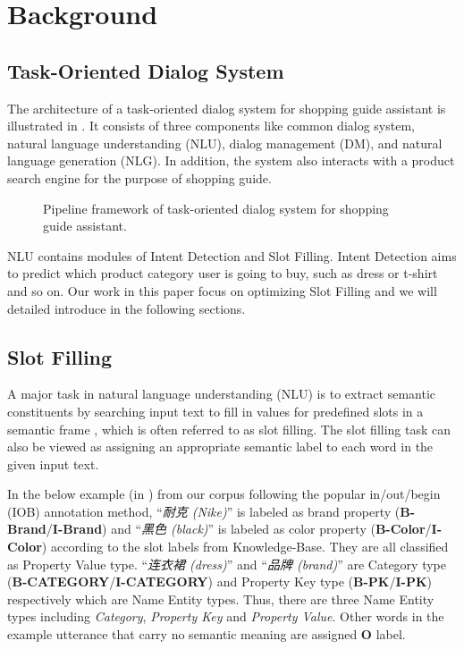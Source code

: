 \section{Background}
\label{sec:background}

\subsection{Task-Oriented Dialog System}
The architecture of a task-oriented dialog system
for shopping guide assistant is illustrated in .
It consists of three components like common dialog system, natural
language understanding (NLU), dialog management
(DM), and natural language generation (NLG).
In addition, the system also interacts with a product search engine
for the purpose of shopping guide. 
\begin{figure}[h]
	\centering
	\caption{Pipeline framework of task-oriented dialog system for shopping guide assistant.}
	\label{fig:dialog_system}
	\vspace{-10pt}
\end{figure}

NLU contains modules of Intent Detection and Slot Filling.
Intent Detection aims to predict which product category user is going to buy,
such as dress or t-shirt and so on.
Our work in this paper focus on optimizing Slot Filling
and we will detailed introduce in the following sections.

\subsection{Slot Filling}
\label{sec:slot_filling}
A major task in natural language understanding (NLU) is to extract semantic constituents
by searching input text to fill in values for predefined slots in a semantic frame \cite{mesnil2015using},
which is often referred to as slot filling.
The slot filling task can also be viewed as assigning
an appropriate semantic label to each word in
the given input text.

In the below example (in ) from our corpus following the popular in/out/begin (IOB) annotation method,
``\emph{耐克 (Nike)}'' is labeled as brand property (\textbf{B-Brand}/\textbf{I-Brand}) and ``\emph{黑色 (black)}'' is labeled as color property (\textbf{B-Color}/\textbf{I-Color})
according to the slot labels from Knowledge-Base.
They are all classified as Property Value type.
``\emph{连衣裙 (dress)}'' and ``\emph{品牌 (brand)}'' are Category type (\textbf{B-CATEGORY}/\textbf{I-CATEGORY})
and Property Key type (\textbf{B-PK}/\textbf{I-PK}) respectively which are Name Entity types.
Thus, there are three Name Entity types including \emph{Category}, \emph{Property Key} and \emph{Property Value}.
Other words in the example utterance that carry no semantic meaning are assigned \textbf{O} label.

